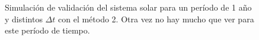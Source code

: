 \begin{figure}
{	\label{fig:ej2_m2_365_12}
	}
	\caption{
		Simulación de validación del sistema solar para un período de 1 año y distintos $\Delta t$
		con el método 2.
		Otra vez no hay mucho que ver para este período de tiempo.
	}
	\label{ fig:res_ej2_m2_365 }
\end{figure}
